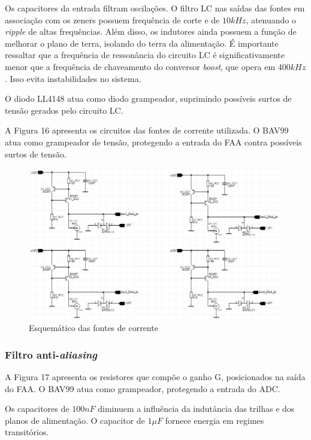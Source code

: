 \documentclass[
	12pt,				%
	openright,			%
	twoside,			%
	a4paper,			%
	english,			%
	french,				%
	spanish,			%
	brazil,				%
	]{abntex2}
\begin{document}
				Os capacitores da entrada filtram oscilações. O filtro LC
				nas saídas das fontes em associação com os zeners possuem
				frequência de corte e de $10kHz$, atenuando o
				\textit{ripple} de altas frequências. Além disso, os
				indutores ainda possuem a função de melhorar o plano de
				terra, isolando do terra da alimentação. É importante
				ressaltar que a frequência de ressonância do circuito LC é
				significativamente menor que a frequência de chaveamento do
				conversor \textit{boost}, que opera em $400kHz$. Isso evita
				instabilidades no sistema.

				O diodo LL4148 atua como diodo grampeador, suprimindo
				possíveis surtos de tensão gerados pelo circuito LC.

				A Figura 16 apresenta os circuitos das fontes de corrente
				utilizada. O BAV99 atua como grampeador de tensão,
				protegendo a entrada do FAA contra possíveis surtos de
				tensão.

				\begin{figure}[!ht]
					\centering
					\includegraphics[width=\linewidth]{../Fotos/fonteCorrenteEsquematico.jpg}
					\caption{Esquemático das fontes de corrente}
				\end{figure}				

			\subsubsection{Filtro anti-\textit{aliasing}}

				A Figura 17 apresenta os resistores que compõe o ganho G,
				posicionados na saída do FAA. O BAV99 atua como grampeador,
				protegendo a entrada do ADC.

				Os capacitores de $100nF$ diminuem a influência da
				indutância das trilhas e dos planos de alimentação. O
				capacitor de $1\mu F$ fornece energia em regimes
				transitórios.
\end{document}
